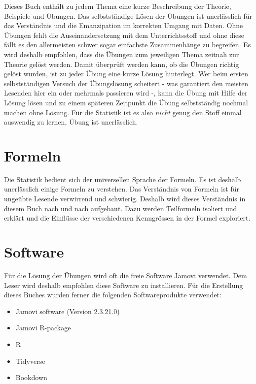 \documentclass[
]{book}
\providecommand{\tightlist}{%
  \setlength{\itemsep}{0pt}\setlength{\parskip}{0pt}}
\theoremstyle{definition}
\theoremstyle{definition}
\theoremstyle{definition}
\theoremstyle{definition}
\theoremstyle{remark}
\begin{document}
Dieses Buch enthält zu jedem Thema eine kurze Beschreibung der Theorie, Beispiele und Übungen. Das selbstständige Lösen der Übungen ist unerlässlich für das Verständnis und die Emanzipation im korrekten Umgang mit Daten. Ohne Übungen fehlt die Auseinandersetzung mit dem Unterrichtsstoff und ohne diese fällt es den allermeisten schwer sogar einfachste Zusammenhänge zu begreifen. Es wird deshalb empfohlen, dass die Übungen zum jeweiligen Thema zeitnah zur Theorie gelöst werden. Damit überprüft werden kann, ob die Übungen richtig gelöst wurden, ist zu jeder Übung eine kurze Lösung hinterlegt. Wer beim ersten selbstständigen Versuch der Übungslösung scheitert - was garantiert den meisten Lesenden hier ein oder mehrmals passieren wird -, kann die Übung mit Hilfe der Lösung lösen und zu einem späteren Zeitpunkt die Übung selbstständig nochmal machen ohne Lösung. Für die Statistik ist es also \emph{nicht} genug den Stoff einmal auswendig zu lernen, Übung ist unerlässlich.

\section{Formeln}\label{formeln}

Die Statistik bedient sich der universellen Sprache der Formeln. Es ist deshalb unerlässlich einige Formeln zu verstehen. Das Verständnis von Formeln ist für ungeübte Lesende verwirrend und schwierig. Deshalb wird dieses Verständnis in diesem Buch nach und nach aufgebaut. Dazu werden Teilformeln isoliert und erklärt und die Einflüsse der verschiedenen Kenngrössen in der Formel exploriert.

\section{Software}\label{software}

Für die Lösung der Übungen wird oft die freie Software Jamovi verwendet. Dem Leser wird deshalb empfohlen diese Software zu installieren. Für die Erstellung dieses Buches wurden ferner die folgenden Softwareprodukte verwendet:

\begin{itemize}
\tightlist
\item
  Jamovi software (Version 2.3.21.0)
\item
  Jamovi R-package \citep{R-jmv}
\item
  R \citep{R-base}
\item
  Tidyverse \citep{tidyverse2019}
\item
  Bookdown \citep{bookdown2016}
\end{itemize}
\end{document}
